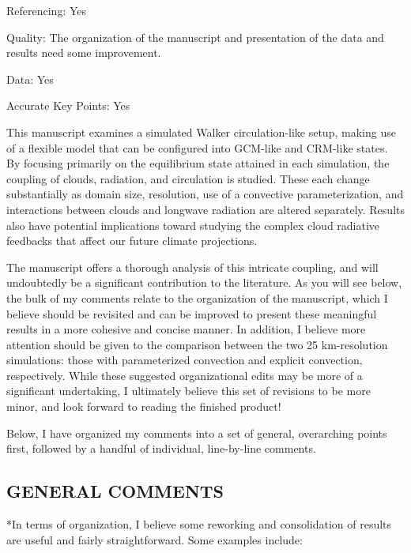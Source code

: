 \documentclass[draft]{agujournal2019}
\begin{document}
Referencing: Yes

Quality: The organization of the manuscript and presentation of the data and results need some improvement.

Data: Yes

Accurate Key Points: Yes

This manuscript examines a simulated Walker circulation-like setup, making use of a flexible model that can be configured into GCM-like and CRM-like states. By focusing primarily on the equilibrium state attained in each simulation, the coupling of clouds, radiation, and circulation is studied. These each change substantially as domain size, resolution, use of a convective parameterization, and interactions between clouds and longwave radiation are altered separately. Results also have potential implications toward studying the complex cloud radiative feedbacks that affect our future climate projections.

The manuscript offers a thorough analysis of this intricate coupling, and will undoubtedly be a significant contribution to the literature. As you will see below, the bulk of my comments relate to the organization of the manuscript, which I believe should be revisited and can be improved to present these meaningful results in a more cohesive and concise manner. In addition, I believe more attention should be given to the comparison between the two 25 km-resolution simulations: those with parameterized convection and explicit convection, respectively. While these suggested organizational edits may be more of a significant undertaking, I ultimately believe this set of revisions to be more minor, and look forward to reading the finished product!

Below, I have organized my comments into a set of general, overarching points first, followed by a handful of individual, line-by-line comments.

\subsection{GENERAL COMMENTS}
*In terms of organization, I believe some reworking and consolidation of results are useful and fairly straightforward. Some examples include:
\end{document}
